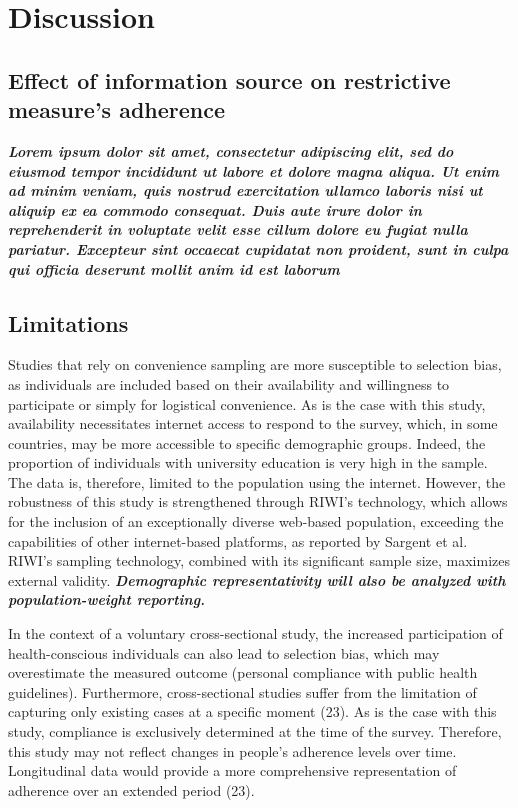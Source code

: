 \documentclass[11pt]{article} %
\begin{document}
    \section{Discussion}
\subsection{Effect of information source on restrictive measure's adherence} 
\textbf{\textit{Lorem ipsum dolor sit amet, consectetur adipiscing elit, sed do eiusmod tempor incididunt ut labore et dolore magna aliqua. Ut enim ad minim veniam, quis nostrud exercitation ullamco laboris nisi ut aliquip ex ea commodo consequat. Duis aute irure dolor in reprehenderit in voluptate velit esse cillum dolore eu fugiat nulla pariatur. Excepteur sint occaecat cupidatat non proident, sunt in culpa qui officia deserunt mollit anim id est laborum}} 

\subsection{Limitations} 
Studies that rely on convenience sampling are more susceptible to selection bias, as individuals are included based on their availability and willingness to participate or simply for logistical convenience. As is the case with this study, availability necessitates internet access to respond to the survey, which, in some countries, may be more accessible to specific demographic groups. Indeed, the proportion of individuals with university education is very high in the sample. The data is, therefore, limited to the population using the internet. However, the robustness of this study is strengthened through RIWI's technology, which allows for the inclusion of an exceptionally diverse web-based population, exceeding the capabilities of other internet-based platforms, as reported by Sargent et al. RIWI's sampling technology, combined with its significant sample size, maximizes external validity. \textbf{\textit{Demographic representativity will also be analyzed with population-weight reporting.}} 

In the context of a voluntary cross-sectional study, the increased participation of health-conscious individuals can also lead to selection bias, which may overestimate the measured outcome (personal compliance with public health guidelines). Furthermore, cross-sectional studies suffer from the limitation of capturing only existing cases at a specific moment (23). As is the case with this study, compliance is exclusively determined at the time of the survey. Therefore, this study may not reflect changes in people's adherence levels over time. Longitudinal data would provide a more comprehensive representation of adherence over an extended period (23).
\end{document}

